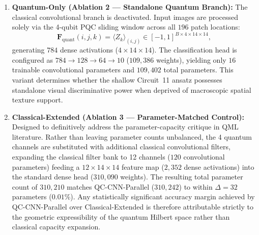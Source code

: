 \documentclass[journal]{IEEEtran}
\begin{document}
\begin{enumerate}
    \item \textbf{Quantum-Only (Ablation 2 --- Standalone Quantum Branch):} The classical convolutional branch is deactivated. Input images are processed solely via the 4-qubit PQC sliding window across all $196$ patch locations:
    \begin{equation}
    \mathbf{F}_{\mathrm{quant}}(i, j, k) = \langle Z_k \rangle_{(i,j)} \in [-1, 1]^{B \times 4 \times 14 \times 14},
    \label{eq:quantum_only_tensor}
    \end{equation}
    generating $784$ dense activations ($4 \times 14 \times 14$). The classification head is configured as $784 \to 128 \to 64 \to 10$ ($109{,}386$ weights), yielding only $16$ trainable convolutional parameters and $109{,}402$ total parameters. This variant determines whether the shallow Circuit~11 ansatz possesses standalone visual discriminative power when deprived of macroscopic spatial texture support.

    \item \textbf{Classical-Extended (Ablation 3 --- Parameter-Matched Control):} Designed to definitively address the parameter-capacity critique in QML literature. Rather than leaving parameter counts unbalanced, the 4 quantum channels are substituted with additional classical convolutional filters, expanding the classical filter bank to 12 channels ($120$ convolutional parameters) feeding a $12 \times 14 \times 14$ feature map ($2{,}352$ dense activations) into the standard dense head ($310{,}090$ weights). The resulting total parameter count of $310{,}210$ matches QC-CNN-Parallel ($310{,}242$) to within $\Delta = 32$ parameters ($0.01\%$). Any statistically significant accuracy margin achieved by QC-CNN-Parallel over Classical-Extended is therefore attributable strictly to the geometric expressibility of the quantum Hilbert space rather than classical capacity expansion.
\end{enumerate}
\end{document}
